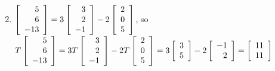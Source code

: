 \begin{multicols}{2}
\begin{ex}
{\begin{enumerate}[label={\alph*.}]
\end{enumerate}}
\begin{sol}
\begin{enumerate}[label={\alph*.}]
\setcounter{enumi}{1}
\item $\left[ \begin{array}{r}
5 \\
6 \\
-13
\end{array} \right] = 3 \left[ \begin{array}{r}
3 \\
2 \\
-1
\end{array} \right] - 2 \left[ \begin{array}{r}
2 \\
0 \\
5
\end{array} \right]$, so\\
$T \left[ \begin{array}{r}
5 \\
6 \\
-13
\end{array} \right] = 3T \left[ \begin{array}{r}
3 \\
2 \\
-1
\end{array} \right] - 2T \left[ \begin{array}{r}
2 \\
0 \\
5
\end{array} \right] = 3 \left[ \begin{array}{r}
3 \\
5
\end{array} \right] - 2 \left[ \begin{array}{r}
-1 \\
2
\end{array} \right] = \left[ \begin{array}{r}
11 \\
11
\end{array} \right]$

\end{enumerate}
\end{sol}
\end{ex}


\end{multicols}
